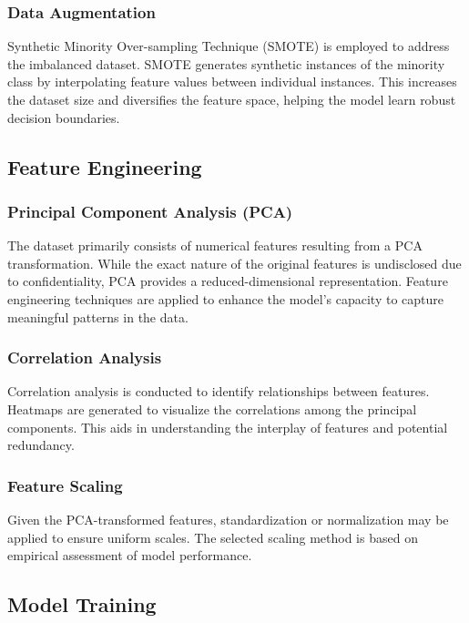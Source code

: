 \documentclass[journal]{IEEEtran}
\begin{document}
\subsubsection{Data Augmentation}

Synthetic Minority Over-sampling Technique (SMOTE) is employed to address the imbalanced dataset. SMOTE generates synthetic instances of the minority class by interpolating feature values between individual instances. This increases the dataset size and diversifies the feature space, helping the model learn robust decision boundaries. 

\subsection{Feature Engineering}

\subsubsection{Principal Component Analysis (PCA)}

The dataset primarily consists of numerical features resulting from a PCA transformation\cite{PCA}. While the exact nature of the original features is undisclosed due to confidentiality, PCA provides a reduced-dimensional representation. Feature engineering techniques are applied to enhance the model's capacity to capture meaningful patterns in the data.

\subsubsection{Correlation Analysis}

Correlation analysis is conducted to identify relationships between features. Heatmaps are generated to visualize the correlations among the principal components. This aids in understanding the interplay of features and potential redundancy.

\subsubsection{Feature Scaling}

Given the PCA-transformed features, standardization or normalization may be applied to ensure uniform scales. The selected scaling method is based on empirical assessment of model performance.

\subsection{Model Training}
\end{document}
